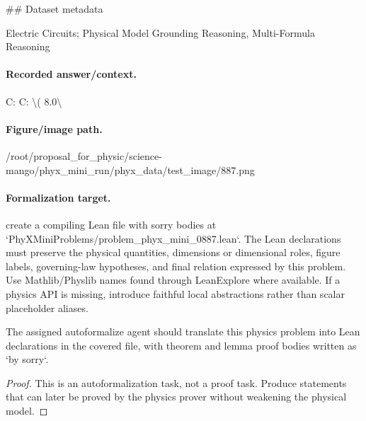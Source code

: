 \#\# Dataset metadata

Electric Circuits; Physical Model Grounding Reasoning, Multi-Formula Reasoning

\paragraph{Recorded answer/context.}
C: C: \textbackslash{}( 8.0\textbackslash{}

\paragraph{Figure/image path.}
/root/proposal\_for\_physic/science-mango/phyx\_mini\_run/phyx\_data/test\_image/887.png

\paragraph{Formalization target.}
create a compiling Lean file with sorry bodies at `PhyXMiniProblems/problem\_phyx\_mini\_0887.lean`. The Lean declarations must preserve the physical quantities, dimensions or dimensional roles, figure labels, governing-law hypotheses, and final relation expressed by this problem.
Use Mathlib/Physlib names found through LeanExplore where available. If a physics API is missing, introduce faithful local abstractions rather than scalar placeholder aliases.

\begin{theorem}
\label{thm:physics:phyx_mini_0887:target}
The assigned autoformalize agent should translate this physics problem into Lean declarations in the covered file, with theorem and lemma proof bodies written as `by sorry`.
\end{theorem}
\begin{proof}
This is an autoformalization task, not a proof task. Produce statements that can later be proved by the physics prover without weakening the physical model.
\end{proof}

